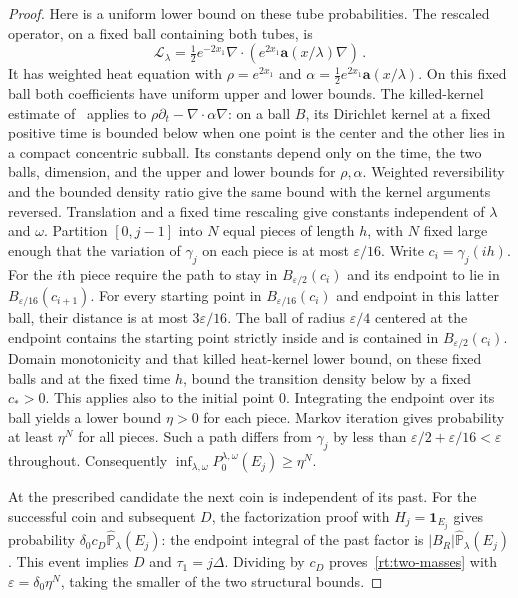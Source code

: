 \documentclass[11pt]{amsart}
\theoremstyle{definition}
\theoremstyle{remark}
\numberwithin{equation}{section}
\renewcommand{\a}{\mathbf a}
\renewcommand{\epsilon}{\varepsilon}
\begin{document}
\begin{proof}
Here is a uniform lower bound on these tube probabilities. The rescaled operator, on a fixed ball containing both tubes, is
\begin{equation*}
 \mathcal L_\lambda=\tfrac12e^{-2x_1}
          \nabla\cdot(e^{2x_1}\a(x/\lambda)\nabla)\, .
\end{equation*}
It has weighted heat equation with $\rho=e^{2x_1}$ and $\alpha=\tfrac12e^{2x_1}\a(x/\lambda)$. On this fixed ball both coefficients have uniform upper and lower bounds. The killed-kernel estimate of~\citet[Lemma~5.3, (5.4)--(5.5)]{Einstein2012gantert} applies to $\rho\partial_t-\nabla\cdot\alpha\nabla$: on a ball $B$, its Dirichlet kernel at a fixed positive time is bounded below when one point is the center and the other lies in a compact concentric subball. Its constants depend only on the time, the two balls, dimension, and the upper and lower bounds for $\rho,\alpha$. Weighted reversibility and the bounded density ratio give the same bound with the kernel arguments reversed. Translation and a fixed time rescaling give constants independent of $\lambda$ and $\omega$. Partition $[0,j-1]$ into $N$ equal pieces of length $h$, with $N$ fixed large enough that the variation of $\gamma_j$ on each piece is at most $\epsilon/16$. Write $c_i=\gamma_j(ih)$. For the $i$th piece require the path to stay in $B_{\epsilon/2}(c_i)$ and its endpoint to lie in $B_{\epsilon/16}(c_{i+1})$. For every starting point in $B_{\epsilon/16}(c_i)$ and endpoint in this latter ball, their distance is at most $3\epsilon/16$. The ball of radius $\epsilon/4$ centered at the endpoint contains the starting point strictly inside and is contained in $B_{\epsilon/2}(c_i)$. Domain monotonicity and that killed heat-kernel lower bound, on these fixed balls and at the fixed time $h$, bound the transition density below by a fixed $c_*>0$. This applies also to the initial point $0$. Integrating the endpoint over its ball yields a lower bound $\eta>0$ for each piece. Markov iteration gives probability at least $\eta^N$ for all pieces. Such a path differs from $\gamma_j$ by less than $\epsilon/2+\epsilon/16<\epsilon$ throughout. Consequently $\inf_{\lambda,\omega}P_0^{\lambda,\omega}(E_j)\geq\eta^N$.

At the prescribed candidate the next coin is independent of its past. For the successful coin and subsequent $D$, the factorization proof with $H_j=\mathbf1_{E_j}$ gives probability $\delta_0 c_D\widehat{\mathbb P}_\lambda(E_j)$: the endpoint integral of the past factor is $|B_R|\widehat{\mathbb P}_\lambda(E_j)$. This event implies $D$ and $\tau_1=j\Delta$. Dividing by $c_D$ proves~\eqref{rt:two-masses} with $\varepsilon=\delta_0\eta^N$, taking the smaller of the two structural bounds.


\end{proof}
\end{document}
